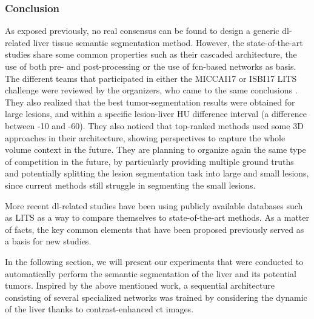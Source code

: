 \subsubsection{Conclusion}

As exposed previously, no real consensus can be found to design a
generic \ac{dl}-related liver tissue semantic segmentation method. However,
the state-of-the-art studies share some common properties such as their
cascaded architecture, the use of both pre- and post-processing or the
use of \ac{fcn}-based networks as basis.
The different teams that participated in either the MICCAI17 or ISBI17
LITS challenge were reviewed by the organizers, who came to the same
conclusions \cite{Bilic2019}.
They also realized that the best tumor-segmentation results were
obtained for large lesions, and within a specific lesion-liver HU
difference interval (a difference between -10 and -60).
They also noticed that top-ranked methods used some 3D approaches in
their architecture, showing perspectives to capture the whole
volume context in the future. They are planning to organize again the same
type of competition in the future, by particularly providing multiple
ground truths and potentially splitting the lesion segmentation task
into large and small lesions, since current methods still struggle in
segmenting the small lesions.

More recent \ac{dl}-related studies have been using publicly available
databases such as LITS as a way to compare themselves to
state-of-the-art methods. As a matter of facts, the key common elements
that have been proposed previously served as a basis for new studies.

In the following section, we will present our experiments that were conducted to automatically perform the semantic segmentation of the liver and its potential tumors. Inspired by the above mentioned work, a sequential architecture consisting of several specialized networks was trained by considering the dynamic of the liver thanks to contrast-enhanced \ac{ct} images. 


%

